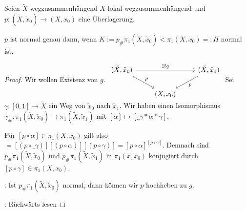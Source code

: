 \begin{st}
    Seien $\tilde X$ wegzusammenhängend $X$ lokal wegzusammenhängend und $p: (\tilde X, \tilde x_0) \to (X, x_0)$ eine Überlagerung.

    $p$ ist normal genau dann, wenn $K := p_\# \pi_1(\tilde X, \tilde x_0) < \pi_1(X, x_0) =: H$ normal ist.
    \begin{proof}
        Wir wollen Existenz von $g$.
        \begin{math}
            \begin{tikzcd}
                (\tilde X, \tilde x_0) \ar[rr,"\exists! g"] \ar[rd,"p"] & & (\tilde X, \tilde x_1) \ar[ld,"p"] \\
                & (X, x_0) &
            \end{tikzcd}
        \end{math}
        Sei $\gamma: [0,1] \to \tilde X$ ein Weg von $\tilde x_0$ nach $\tilde x_1$.
        Wir haben einen Isomorphismus $\gamma_\#: \pi_1(\tilde X, \tilde x_0) \to \pi_1(\tilde X, \tilde x_1)$ mit $[\alpha] \mapsto [\_\gamma \ast \alpha \ast \gamma]$.

        Für $[p \circ \alpha] \in \pi_1(X, x_0)$ gilt also
        \begin{math}
            [p \circ \gamma_\# \alpha] = [(p \circ \_\gamma)] [(p \circ \alpha)] [(p \circ \gamma)]
            = [p \circ \alpha]^{[p \circ \gamma]}.
        \end{math}
        Demnach sind $p_\# \pi_1(\tilde X, \tilde x_0)$ und $p_\# \pi_1(\tilde X, \tilde x_1)$ in $\pi_1(x, x_0)$ konjugiert durch $[p \circ \gamma] \in \pi_1(X, x_0)$.

        \ProofImplication*:
        Ist $p_\# \pi_1(\tilde X, \tilde x_0)$ normal, dann können wir $p$ hochheben zu $g$.

        \ProofImplication:
        Rückwärts lesen
    \end{proof}
\end{st}
